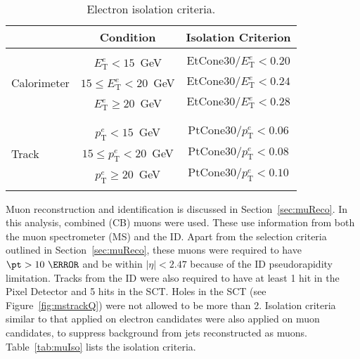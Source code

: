 \begin{table}[!h]
\begin{center}
\begin{tabular}{|l|cc|}
\hline
           								& Condition                & Isolation Criterion   \\
\hline\hline
					& &  \\
\multirow{3}{*}{Calorimeter}  &  $E^{e}_{\mathrm{T}} < 15$~GeV	   & $\mathrm{EtCone30} / E^{e}_{\mathrm{T}} < 0.20$ \\
													& 	$15 \le E^{e}_{\mathrm{T}} < 20$~GeV & $\mathrm{EtCone30} / E^{e}_{\mathrm{T}} < 0.24$  \\
													& 	$E^{e}_{\mathrm{T}} \ge 20$~GeV & $\mathrm{EtCone30} / E^{e}_{\mathrm{T}} < 0.28$  \\
					& &  \\
\hline
					& &  \\
\multirow{3}{*}{Track}  &  $p^{e}_{\mathrm{T}} < 15$~GeV &  $\mathrm{PtCone30} / p^{e}_{\mathrm{T}} < 0.06$  \\
												&  $15 \le p^{e}_{\mathrm{T}} < 20$~GeV &  $\mathrm{PtCone30} / p^{e}_{\mathrm{T}} < 0.08$ \\
                        & $p^{e}_{\mathrm{T}} \ge 20$~GeV & $\mathrm{PtCone30} / p^{e}_{\mathrm{T}} < 0.10$ \\
					& &  \\
\hline
\end{tabular}
\end{center}
\caption{Electron isolation criteria.}
\label{tab:eleIso}
\end{table}

\par Muon reconstruction and identification is discussed in Section~\ref{sec:muReco}.
In this analysis, combined (CB) muons were used. These use information from both the 
muon spectrometer (MS) and the ID. Apart from the selection criteria outlined in 
Section~\ref{sec:muReco}, these muons were required to have $\pt>10~\GeV$ and be within 
$|\eta|<2.47$ because of the ID pseudorapidity limitation. Tracks from the ID were also required 
to have at least 1 hit in the Pixel Detector and 5 hits in the SCT. Holes in the SCT (see Figure~\ref{fig:mstrackQ})
were not allowed to be more than 2. Isolation criteria similar to that applied on electron 
candidates were also applied on muon candidates, to suppress background from jets 
reconstructed as muons. Table~\ref{tab:muIso} lists the isolation criteria.    

